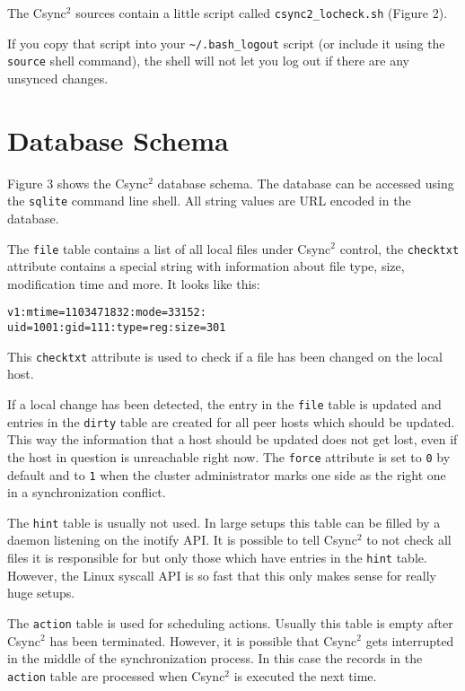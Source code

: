 \documentclass[a4paper,twocolumn]{article}
\def\csync2{{\sc Csync$^{2}$}}
\begin{document}
The \csync2 sources contain a little script called {\tt csync2\_locheck.sh} 
(Figure 2).

If you copy that script into your {\tt \textasciitilde/.bash\_logout} script
(or include it using the {\tt source} shell command), the shell will not let
you log out if there are any unsynced changes.

\section{Database Schema}

Figure 3 shows the \csync2 database schema. The database can be accessed using
the {\tt sqlite} command line shell. All string values are URL encoded in the
database.

The {\tt file} table contains a list of all local files under \csync2 control,
the {\tt checktxt} attribute contains a special string with information about
file type, size, modification time and more. It looks like this:

\begin{verbatim}
v1:mtime=1103471832:mode=33152:
uid=1001:gid=111:type=reg:size=301
\end{verbatim}

This {\tt checktxt} attribute is used to check if a file has been changed on
the local host.

If a local change has been detected, the entry in the {\tt file} table is
updated and entries in the {\tt dirty} table are created for all peer hosts
which should be updated. This way the information that a host should be updated
does not get lost, even if the host in question is unreachable right now. The
{\tt force} attribute is set to {\tt 0} by default and to {\tt 1} when the
cluster administrator marks one side as the right one in a synchronization
conflict.

The {\tt hint} table is usually not used. In large setups this table can be
filled by a daemon listening on the inotify API. It is possible to tell \csync2
to not check all files it is responsible for but only those which have entries
in the {\tt hint} table. However, the Linux syscall API is so fast that this
only makes sense for really huge setups.

The {\tt action} table is used for scheduling actions. Usually this table is
empty after \csync2 has been terminated. However, it is possible that \csync2
gets interrupted in the middle of the synchronization process. In this case
the records in the {\tt action} table are processed when \csync2 is executed
the next time.
\end{document}
